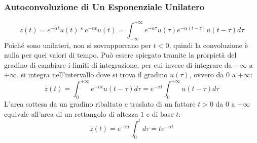 \documentclass{article}
\numberwithin{equation}{subsection}
\begin{document}
\begin{center}
\end{center}

\subsubsection{Autoconvoluzione di Un Esponenziale Unilatero}

\begin{equation*}
    z(t)=e^{-\alpha t}u(t)*e^{-\alpha t}u(t)=\displaystyle\int_{-\infty}^{+\infty}e^{-\alpha\tau}u(\tau)e^{-\alpha(t-\tau)}u(t-\tau)d\tau
\end{equation*}
Poiché sono unilateri, non si sovrapporrano per $t<0$, quindi la convoluzione è nulla per quei valori di tempo. Può essere spiegato tramite la prorpietà del gradino di 
cambiare i limiti di integrazione, per cui invece di integrare da $-\infty$ a $+\infty$, si integra nell'intervallo dove si trova il gradino $u(\tau)$, ovvero da $0$ a $+\infty$: 
\begin{equation*}
    z(t)=\displaystyle\int_0^{+\infty}e^{-\alpha t}u(t-\tau)d\tau=e^{-\alpha t}\int_0^{+\infty}u(t-\tau)d\tau
\end{equation*}
L'area sottesa da un gradino ribaltato e traslato di un fattore $t>0$ da $0$ a $+\infty$ equivale all'area di un rettangolo di altezza $1$ e di base $t$:
\begin{equation*}
    z(t)=e^{-\alpha t}\displaystyle\int_0^td\tau=te^{-\alpha t}
\end{equation*}
\end{document}
